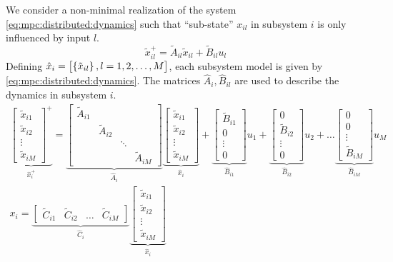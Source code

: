 We consider a non-minimal realization of the system \eqref{eq:mpc:distributed:dynamics}
such that ``sub-state'' $x_{il}$ in subsystem $i$ is only influenced
by input $l$.
\begin{equation}
\tilde{x}^+_{il} = \tilde{A}_{il}\tilde{x}_{il} + \tilde{B}_{il}u_l 
\end{equation}
Defining $\hat{x}_i = \begin{bmatrix} \left\lbrace \tilde{x}_{il} \right\rbrace, l =
  {1,2,\ldots,M}\end{bmatrix}$, each subsystem model is given by
  \eqref{eq:mpc:distributed:dynamics}. The matrices
  $\hat{A}_i,\hat{B}_{il}$ are used to describe the dynamics in
  subsystem $i$.
\begin{gather}
\underbrace{\begin{bmatrix} \tilde{x}_{i1}\\\tilde{x}_{i2} \\\vdots\\\tilde{x}_{iM}\end{bmatrix}^+}_{\hat{x}_i^+} =
 \underbrace{\begin{bmatrix} \tilde{A}_{i1} &  & & \\
  & \tilde{A}_{i2}& & \\
  & & \ddots & \\ & & &\tilde{A}_{iM} \end{bmatrix}
 }_{\hat{A}_i}
 \underbrace{\begin{bmatrix} \tilde{x}_{i1}\\
 \tilde{x}_{i2} \\
 \vdots\\
 \tilde{x}_{iM}
 \end{bmatrix}}_{\hat{x}_i}+
 \underbrace{\begin{bmatrix}\tilde{B}_{i1}\\0\\\vdots\\0\end{bmatrix}}_{\hat{B}_{i1}}u_1
 +
 \underbrace{\begin{bmatrix}0\\\tilde{B}_{i2}\\\vdots\\0\end{bmatrix}}_{\hat{B}_{i2}}u_2
 + \ldots
 \underbrace{\begin{bmatrix}0\\0\\\vdots\\\tilde{B}_{iM}\end{bmatrix}}_{\hat{B}_{iM}}u_M
 \label{eq:mpc:distributed:subsystem}
\\
x_i = \underbrace{\begin{bmatrix} \tilde{C}_{i1} & \tilde{C}_{i2} & \ldots & \tilde{C}_{iM}\end{bmatrix}}_{\hat{C}_i}\underbrace{\begin{bmatrix} \tilde{x}_{i1}\\
\tilde{x}_{i2} \\
\vdots\\
\tilde{x}_{iM} \end{bmatrix}}_{\hat{x}_i}
\end{gather}

